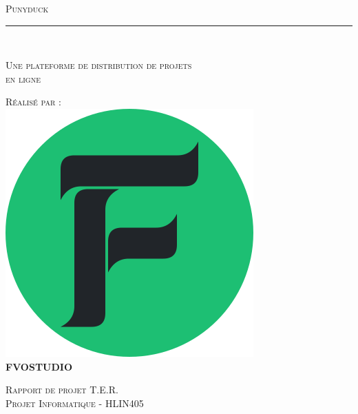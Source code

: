 \documentclass[twoside]{report}
\begin{document}
\begin{titlepage}
\Montserrat

\begin{center}
\textsc{\Huge{Punyduck}}\\

\vspace*{0.3cm}
\rule{2cm}{0.1pt}\\
\vspace*{0.3cm}

\textsc{\LARGE{Une plateforme de distribution de projets\\ \vspace{0.1cm} en ligne}}

\vspace{0.8cm}
\textsc{Réalisé par :}\\
\vspace{0.2cm}
\includegraphics[scale=0.35]{fvologo1.png}\\
\vspace{0.2cm}
\large{\textbf{\color{fvo-green}FVO\color{fvo-gray}STUDIO}}

\vspace{1cm}
\textsc{\Large{Rapport de projet T.E.R.}}\\
\vspace{0.2cm}
\textsc{\Large{Projet Informatique - HLIN405}} 
\end{center}


\end{titlepage}
\end{document}
